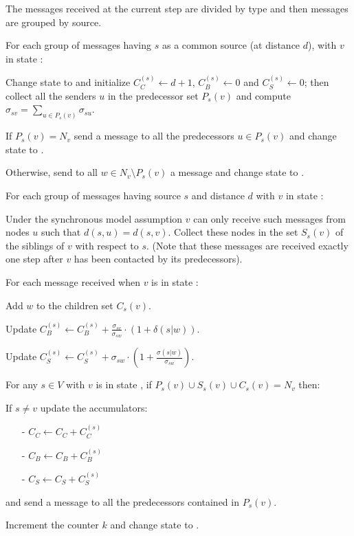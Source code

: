 \begin{algosteps}
  \item The messages received at the current step are divided by type and then \mdisc{} messages are grouped by source.
  \item For each group of  messages having $s$ as a common source (at distance $d$), with $v$ in state :
  \begin{algosteps}
    \item Change state to  and initialize $C_C^{(s)} \gets d+1$, $C_B^{(s)} \gets 0$ and $C_S^{(s)} \gets 0$; then collect all the senders $u$ in the predecessor set $P_s(v)$ and compute $\sigma_{sv} = \sum_{u \in P_s(v)} \sigma_{su}$.
    \item If $P_s(v) = N_v$ send a  message to all the predecessors $u \in P_s(v)$ and change state to . 
    \item Otherwise, send to all $w \in N_v \setminus P_s(v)$ a  message and change state to .
  \end{algosteps}
    \item For each group of  messages having source $s$ and distance $d$ with $v$ in state :
    \begin{algosteps}
      \item Under the synchronous model assumption $v$ can only receive such messages from nodes $u$ such that $d(s,u) = d(s,v)$. Collect these nodes in the set $S_s(v)$ of the siblings of $v$ with respect to $s$. (Note that these messages are received exactly one step after $v$ has been contacted by its predecessors).
    \end{algosteps}
  \item For each  message received when $v$ is in state :
  \begin{algosteps}
      \item Add $w$ to the children set $C_s(v)$.
      \item Update $C_B^{(s)} \gets C_B^{(s)} + \frac{\sigma_{sv}}{\sigma_{sw}} \cdot (1 + \delta(s|w))$.
      \item Update $C_S^{(s)} \gets C_S^{(s)} + \sigma_{sw} \cdot ( 1 + \frac{\sigma(s|w)}{\sigma_{sw}})$.
    \end{algosteps}
  \item For any $s \in V$ with $v$ is in state , if $P_s(v) \cup S_s(v) \cup C_s(v) = N_v$ then:
  \begin{algosteps}
      \item If $s \neq v$ update the accumulators:
      \begin{itemize}
        \item[-] $C_C \gets C_C + C_C^{(s)}$
        \item[-] $C_B \gets C_B + C_B^{(s)}$
        \item[-] $C_S \gets C_S + C_S^{(s)}$
      \end{itemize}
      and send a  message to all the predecessors contained in $P_s(v)$.
      \item Increment the counter $k$ and change state to .
    \end{algosteps}
\end{algosteps}
